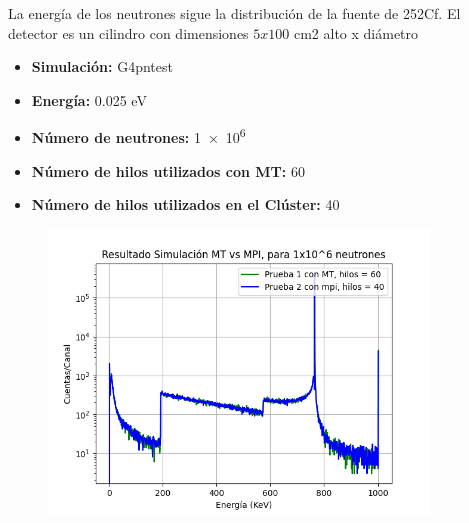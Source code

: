 La energía de los neutrones sigue la distribución de la fuente de 252Cf. El detector es un cilindro con dimensiones $5x100$ cm2 alto x diámetro

\begin{itemize}
    \item \textbf{Simulación:} G4pntest
    \item \textbf{Energía:} 0.025 eV
    \item \textbf{Número de neutrones:} \num{1e6}
    \item \textbf{Número de hilos utilizados con MT:} 60 
    \item \textbf{Número de hilos utilizados en el Clúster:} 40
    
\end{itemize}


\begin{figure}[htb]
	\centering
	\includegraphics[width=0.9\textwidth]{images/test_MT_vs_Cluster.png}
	\label{fig:AntennaDesign}
\end{figure}

